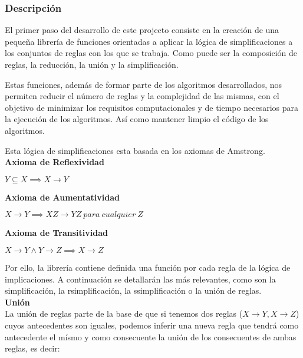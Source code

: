 \subsubsection{Descripci\'on} 

El primer paso del desarrollo de este projecto consiste en la creaci\'on de una peque\~na librer\'ia de funciones
orientadas a aplicar la l\'ogica de simplificaciones a los conjuntos de reglas con los que se trabaja. Como 
puede ser la composici\'on de reglas, la reducci\'on, la uni\'on y la simplificaci\'on.

Estas funciones, adem\'as de formar parte de los algoritmos desarrollados, nos permiten reducir el n\'umero de 
reglas y la complejidad de las mismas, con el objetivo de minimizar los requisitos computacionales y de tiempo
necesarios para la ejecuci\'on de los algoritmos. As\'i como mantener limpio el c\'odigo de los algoritmos.

Esta l\'ogica de simplificaciones esta basada en los axiomas de Amstrong.\\

\textbf{Axioma de Reflexividad}

\begin{center}
    \(Y \subseteq X \implies X \to Y \)
\end{center}

\textbf{Axioma de Aumentatividad}

\begin{center}
    \(X \to Y \implies XZ \to YZ \ para \ cualquier \ Z \)
\end{center}

\textbf{Axioma de Transitividad}

\begin{center}
    \(X \to Y \wedge Y \to Z \implies X \to Z \)
\end{center}

Por ello, la librer\'ia contiene definida una funci\'on por cada regla de la l\'ogica de implicaciones. A continuaci\'on se detallar\'an las m\'as relevantes, como son la simplificaci\'on, la rsimplificaci\'on, la ssimplificaci\'on o la uni\'on de reglas.\\

\textbf{Uni\'on}\\
La uni\'on de reglas parte de la base de que si tenemos dos reglas (\(X \to Y , X \to Z\)) cuyos antecedentes son iguales, podemos inferir una nueva regla que tendr\'a como antecedente el m\'ismo y como consecuente la uni\'on de los consecuentes de ambas reglas, es decir:

